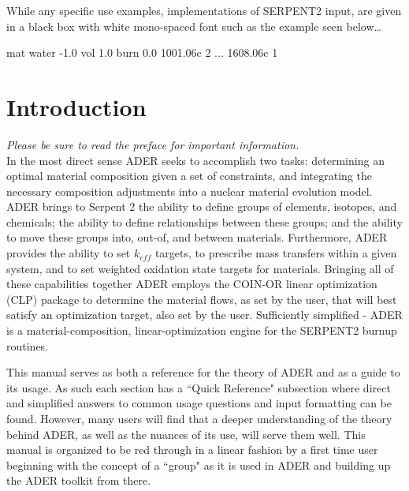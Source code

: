 \documentclass{article}
\numberwithin{equation}{section}
\begin{document}
While any specific use examples, implementations of SERPENT2 input, are given
in a black box with white mono-spaced font such as the example seen below\ldots

\begin{li}
mat water -1.0 vol 1.0 burn 0.0
1001.06c    2
...
1608.06c    1
\end{li}

\section{Introduction}\label{sec:intro}

\textit{Please be sure to read the preface for important information.}\\
In the most direct sense ADER seeks to accomplish two tasks: 
determining an  optimal  material  composition  given  a  set  
of  constraints,  and  integrating the necessary composition adjustments 
into a nuclear material evolution model.
ADER brings to Serpent 2 the ability to define groups of elements,
isotopes, and chemicals; the ability to define relationships between these 
groups; and the ability to move these groups into, out-of, and between 
materials. Furthermore, ADER provides the ability to set
$k_{eff}$ targets, to prescribe mass transfers within a given system, and to set
weighted oxidation state targets for materials. Bringing all of these
capabilities together ADER employs the COIN-OR linear optimization (CLP) 
package to determine the material flows, as  set by the user, 
that will best satisfy an optimization target, also set by the user. 
Sufficiently simplified - ADER is a material-composition, linear-optimization
engine for the SERPENT2 burnup routines. 

This manual serves as both a reference for the theory of ADER and as a guide to
its usage. As such each section has a ``Quick Reference" subsection where
direct and simplified answers to common usage questions and input formatting
can be found. However, many users will find that a deeper understanding of the
theory behind ADER, as well as the nuances of its use, will serve them well. 
This manual is organized to be red through in a linear fashion by a first time
user beginning with the concept of a ``group" as it is used in ADER and
building up the ADER toolkit from there.
\end{document}

